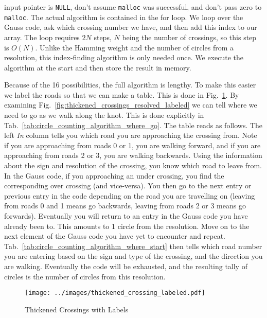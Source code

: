 \documentclass{article}
\theoremstyle{plain}
\begin{document}
        input pointer is \texttt{NULL}, don't assume \texttt{malloc} was
        successful, and don't pass zero to \texttt{malloc}. The actual algorithm
        is contained in the for loop. We loop over the Gauss code, ask which
        crossing number we have, and then add this index to our array. The
        loop requires $2N$ steps, $N$ being the number of crossings, so this
        step is $O(N)$. Unlike the Hamming weight and the number of circles
        from a resolution, this index-finding algorithm is only needed once. We
        execute the algorithm at the start and then store the result in
        memory.
        \par\hfill\par
        Because of the 16 possibilities, the full algorithm is lengthy. To make
        this easier we label the roads so that we can make a table. This is
        done in Fig.~\ref{fig:thickened_crossings_labeled}. By examining
        Fig.~\ref{fig:thickened_crossings_resolved_labeled} we can tell where
        we need to go as we walk along the knot. This is done explicitly in
        Tab.~\ref{tab:circle_counting_algorithm_where_go}. The table reads as follows.
        The left \textit{In} column tells you which road you are approaching the
        crossing from. Note if you are approaching from roads 0 or 1, you are
        walking forward, and if you are approaching from roads 2 or 3, you are
        walking backwards. Using the information about the sign and resolution
        of the crossing, you know which road to leave from. In the Gauss code,
        if you approaching an under crossing, you find the corresponding
        over crossing (and vice-versa). You then go to the next entry or
        previous entry in the code depending on the road you are travelling
        on (leaving from roads 0 and 1 means go backwards, leaving from roads
        2 or 3 means go forwards). Eventually you will return to an entry in
        the Gauss code you have already been to. This amounts to 1 circle from
        the resolution. Move on to the next element of the Gauss code you have
        yet to encounter and repeat. Tab.~\ref{tab:circle_counting_algorithm_where_start}
        then tells which road number you are entering based on the sign and type
        of the crossing, and the direction you are walking. Eventually the code
        will be exhausted, and the resulting tally of circles is the number of
        circles from this resolution.
        \begin{figure}
            \centering
            \texttt{[image: ../images/thickened\_crossing\_labeled.pdf]}
            \caption{Thickened Crossings with Labels}
            \label{fig:thickened_crossings_labeled}
        \end{figure}
\end{document}
